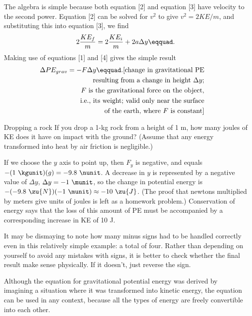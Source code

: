 The algebra is simple because both equation [2] and
equation [3] have velocity to the second power. Equation [2]
can be solved for $v^2$ to give $v^2 = 2KE/m$, and
substituting this into equation [3], we find
\begin{equation*}
                2\frac{KE_f}{m}  =  2\frac{KE_i}{m} + 2a\Delta y\eqquad.
\end{equation*}
Making use of equations [1] and [4] gives the simple result
\begin{multline*}
                \Delta PE_{grav}  =  -F\Delta y\eqquad. \hfill
\shoveright{\text{[change in  gravitational PE}}\\
\shoveright{\text{resulting from a change in height $\Delta y$;}}\\
\shoveright{\text{$F$ is the gravitational force on the object,}}\\
\shoveright{\text{i.e., its weight; valid only near the surface}}\\
\shoveright{\text{of the earth, where $F$ is constant]}}\\
\end{multline*}

\begin{eg}{Dropping a rock}
\egquestion If you drop a 1-kg rock from a height of 1 m,
how many joules of KE does it have on impact with the
ground? (Assume that any energy transformed into heat by air
friction is negligible.)

\eganswer If we choose the $y$ axis to point up, then $F_y$
is negative, and equals $-(1\ \kgunit)(g)=-9.8\ \nunit$. A decrease
in $y$ is represented by a negative value of $\Delta y$,
$\Delta y=-1\ \munit$, so the change in potential energy is
$-(-9.8\ \zu{N})(-1\ \munit)\approx-10\ \zu{J}$. (The proof that newtons
multiplied by meters give units of joules is left as a
homework problem.) Conservation of energy says that the loss
of this amount of PE must be accompanied by a corresponding
increase in KE of 10 J.
\end{eg}

It may be dismaying to note how many minus signs had to be
handled correctly even in this relatively simple example: a
total of four. Rather than depending on yourself to avoid
any mistakes with signs, it is better to check whether the
final result make sense physically. If it doesn't,
just reverse the sign.

Although the equation for gravitational potential energy was
derived by imagining a situation where it was transformed
into kinetic energy, the equation can be used in any
context, because all the types of energy are freely
convertible into each other.

